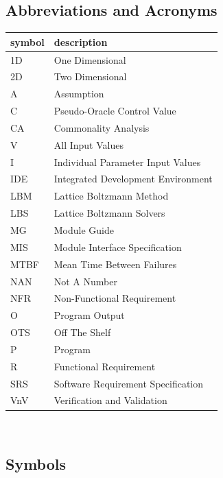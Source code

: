 \documentclass[12pt, titlepage]{article}
\begin{document}
\subsection{Abbreviations and Acronyms}
\renewcommand{\arraystretch}{1.2}
\begin{tabular}{l l} 
  \toprule		
  \textbf{symbol} & \textbf{description}\\
  \midrule 
  1D & One Dimensional\\
  2D & Two Dimensional\\
  A & Assumption\\
  C & Pseudo-Oracle Control Value\\
  CA & Commonality Analysis\\
  V & All Input Values\\
  I & Individual Parameter Input Values\\
  IDE & Integrated Development Environment\\
  LBM & Lattice Boltzmann Method\\
  LBS & Lattice Boltzmann Solvers\\
  MG & Module Guide\\
  MIS & Module Interface Specification\\
  MTBF & Mean Time Between Failures\\
  NAN & Not A Number\\
  NFR & Non-Functional Requirement\\
  O & Program Output\\
  OTS & Off The Shelf\\
  P & Program\\
  R & Functional Requirement\\
  SRS & Software Requirement Specification\\
  VnV & Verification and Validation\\
  \bottomrule
\end{tabular}\\

\newpage

\subsection{Symbols}
\end{document}
